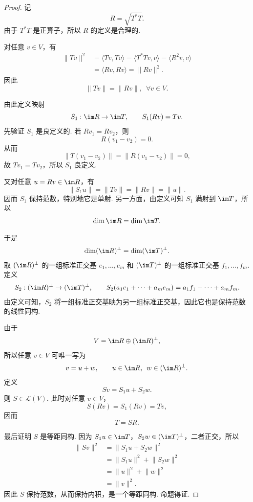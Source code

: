 \begin{proof}
    记
    \[
        R = \sqrt{T^*T}.
    \]
    由于 $T^*T$ 是正算子，所以 $R$ 的定义是合理的.

    对任意 $v \in V$，有
    \begin{align*}
        \lVert Tv \rVert^2
         & = \langle Tv, Tv \rangle
          = \langle T^*Tv, v \rangle
          = \langle R^2v, v \rangle  \\
         & = \langle Rv, Rv \rangle
          = \lVert Rv \rVert^2.
    \end{align*}
    因此
    \[
        \lVert Tv \rVert = \lVert Rv \rVert,\enspace \forall v \in V.
    \]

    由此定义映射
    \[
        S_1 : \im R \to \im T,\qquad S_1(Rv) = Tv.
    \]
    先验证 $S_1$ 是良定义的. 若 $Rv_1 = Rv_2$，则
    \[
        R(v_1-v_2)=0.
    \]
    从而
    \[
        \lVert T(v_1-v_2) \rVert = \lVert R(v_1-v_2) \rVert = 0,
    \]
    故 $Tv_1 = Tv_2$，所以 $S_1$ 良定义.

    又对任意 $u = Rv \in \im R$，有
    \[
        \lVert S_1u \rVert = \lVert Tv \rVert = \lVert Rv \rVert = \lVert u \rVert.
    \]
    因而 $S_1$ 保持范数，特别地它是单射. 另一方面，由定义可知 $S_1$ 满射到 $\im T$，所以
    \[
        \dim \im R = \dim \im T.
    \]

    于是
    \[
        \dim (\im R)^\perp = \dim (\im T)^\perp.
    \]
    取 $(\im R)^\perp$ 的一组标准正交基 $e_1, \ldots, e_m$ 和 $(\im T)^\perp$ 的一组标准正交基 $f_1, \ldots, f_m$. 定义
    \[
        S_2 : (\im R)^\perp \to (\im T)^\perp,\qquad
        S_2(a_1e_1 + \cdots + a_me_m) = a_1f_1 + \cdots + a_mf_m.
    \]
    由定义可知，$S_2$ 将一组标准正交基映为另一组标准正交基，因此它也是保持范数的线性同构.

    由于
    \[
        V = \im R \oplus (\im R)^\perp,
    \]
    所以任意 $v \in V$ 可唯一写为
    \[
        v = u + w,\qquad u \in \im R,\enspace w \in (\im R)^\perp.
    \]
    定义
    \[
        Sv = S_1u + S_2w.
    \]
    则 $S \in \mathcal{L}(V)$. 此时对任意 $v \in V$，
    \[
        S(Rv) = S_1(Rv) = Tv,
    \]
    因而
    \[
        T = SR.
    \]

    最后证明 $S$ 是等距同构. 因为 $S_1u \in \im T$，$S_2w \in (\im T)^\perp$，二者正交，所以
    \begin{align*}
        \lVert Sv \rVert^2
         & = \lVert S_1u + S_2w \rVert^2 \\
         & = \lVert S_1u \rVert^2 + \lVert S_2w \rVert^2 \\
         & = \lVert u \rVert^2 + \lVert w \rVert^2 \\
         & = \lVert v \rVert^2.
    \end{align*}
    因此 $S$ 保持范数，从而保持内积，是一个等距同构. 命题得证.
\end{proof}

